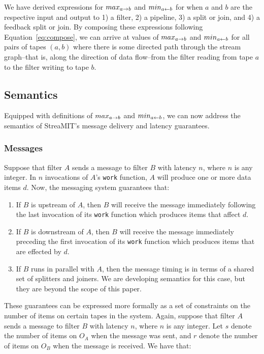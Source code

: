 We have derived expressions for $max_{a \rightarrow b}$ and $min_{a \leftarrow b}$ for when
$a$ and $b$ are the respective input and output to 1) a filter, 2) a
pipeline, 3) a split or join, and 4) a feedback split or join.  By
composing these expressions following Equation~\ref{eq:compose}, we
can arrive at values of $max_{a \rightarrow b}$ and $min_{a \leftarrow b}$ for all pairs of
tapes $(a, b)$ where there is some directed path through the stream
graph--that is, along the direction of data flow--from the filter
reading from tape $a$ to the filter writing to tape $b$.

\subsection{Semantics}

Equipped with definitions of $max_{a \rightarrow b}$ and $min_{a \leftarrow b}$, we can now
address the semantics of StreaMIT's message delivery and latency
guarantees.

\subsubsection{Messages}

Suppose that filter $A$ sends a message to filter $B$ with latency
$n$, where $n$ is any integer.  In $n$ invocations of $A$'s {\tt work}
function, $A$ will produce one or more data items $d$.  Now, the
messaging system guarantees that:
\begin{enumerate}
\item If $B$ is upstream of $A$, then $B$ will receive the message
immediately following the last invocation of its {\tt work} function
which produces items that affect $d$.

\item If $B$ is downstream of $A$, then $B$ will receive the message
immediately preceding the first invocation of its {\tt work} function
which produces items that are effected by $d$.

\item If $B$ runs in parallel with $A$, then the message timing is in terms
of a shared set of splitters and joiners.  We are developing semantics
for this case, but they are beyond the scope of this paper.
\end{enumerate}
These guarantees can be expressed more formally as a set of
constraints on the number of items on certain tapes in the system.
Again, suppose that filter $A$ sends a message to filter $B$ with
latency $n$, where $n$ is any integer.  Let $s$ denote the number of
items on $O_A$ when the message was sent, and $r$ denote the number of
items on $O_B$ when the message is received.  We have that:

